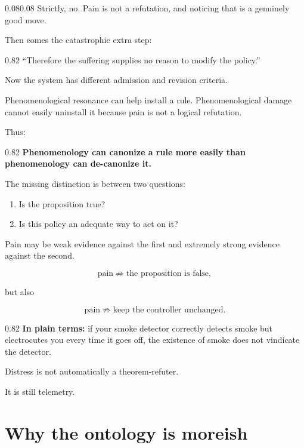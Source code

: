 \documentclass[10pt,letterpaper]{article}
\providecommand{\tightlist}{%
  \setlength{\itemsep}{0.15em}\setlength{\parskip}{0pt}}
\newenvironment{paperbody}
  {\begin{adjustwidth}{0.08\textwidth}{0.08\textwidth}\justifying}
  {\par\end{adjustwidth}}
\newenvironment{voicebox}
  {\Needspace{3.5\baselineskip}\par\vspace{0.22em}\begin{center}\begingroup
   \begin{lrbox}{\voiceboxsave}\begin{varwidth}{0.82\linewidth}
   \small\rmfamily\upshape\RaggedRight}
  {\end{varwidth}\end{lrbox}\fbox{\usebox{\voiceboxsave}}
   \endgroup\end{center}\vspace{0.22em}}
\newenvironment{plainbox}
  {\Needspace{3.5\baselineskip}\par\vspace{0.24em}\begin{center}\begingroup
   \begin{lrbox}{\plainboxsave}\begin{varwidth}{0.82\linewidth}
   \small\rmfamily\upshape\RaggedRight}
  {\end{varwidth}\end{lrbox}\fbox{\usebox{\plainboxsave}}
   \endgroup\end{center}\vspace{0.24em}}
\let\oldsection\section
\renewcommand{\section}{\Needspace{6\baselineskip}\oldsection}
\begin{document}
\begin{paperbody}
Strictly, no. Pain is not a refutation, and noticing that is a genuinely
good move.

Then comes the catastrophic extra step:

\begin{voicebox}
``Therefore the suffering supplies no reason to modify the policy.''
\end{voicebox}

Now the system has different admission and revision criteria.

Phenomenological resonance can help install a rule. Phenomenological
damage cannot easily uninstall it because pain is not a logical
refutation.

Thus:

\begin{voicebox}
\textbf{Phenomenology can canonize a rule more easily than phenomenology
can de-canonize it.}
\end{voicebox}

The missing distinction is between two questions:

\begin{enumerate}
\def\labelenumi{\arabic{enumi}.}
\tightlist
\item
  Is the proposition true?
\item
  Is this policy an adequate way to act on it?
\end{enumerate}

Pain may be weak evidence against the first and extremely strong
evidence against the second.

\[
\text{pain}\not\Rightarrow\text{the proposition is false},
\]

but also

\[
\text{pain}\not\Rightarrow\text{keep the controller unchanged}.
\]

\begin{plainbox}
\textbf{In plain terms:} if your smoke detector correctly detects smoke
but electrocutes you every time it goes off, the existence of smoke does
not vindicate the detector.
\end{plainbox}

Distress is not automatically a theorem-refuter.

It is still telemetry.

\section{Why the ontology is
moreish}\label{why-the-ontology-is-moreish}


\end{paperbody}
\end{document}
